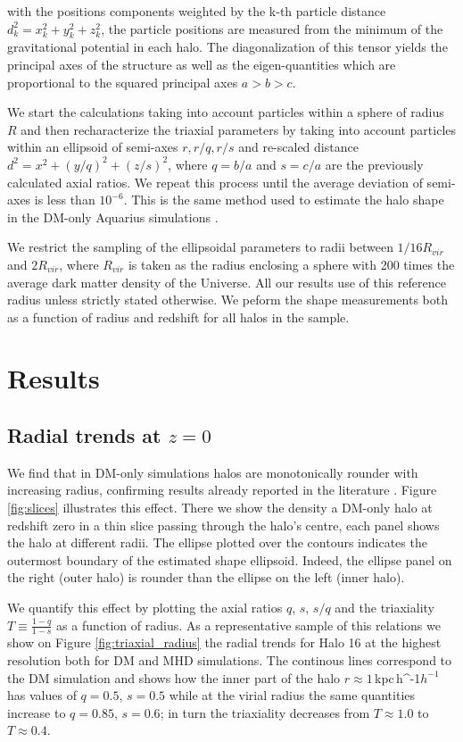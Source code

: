 \documentclass[a4paper,fleqn,usenatbib]{mnras}
\newcommand{\kpch}{\,{\rm kpc}\,\ifmmode h^{-1}\else $h^{-1}$\fi}
\begin{document}
with the positions components weighted by the k-th particle distance
$d_k^2=x_k^2+y_k^2+z_k^2$, the particle positions are measured from
the minimum of the gravitational potential in each halo.
The diagonalization of this tensor yields the principal axes of the
structure as well as the eigen-quantities which are proportional to
the squared principal axes $a>b>c$. 

We start the calculations taking into account particles within a
sphere of radius $R$ and then  recharacterize the triaxial parameters
by taking into account particles within an ellipsoid of semi-axes
$r,r/q,r/s$ and re-scaled distance $d^2=x^2+(y/q)^2+(z/s)^2$, where $q
= b/a$ and $s=c/a$ are the previously calculated axial ratios. 
We repeat this process until the average deviation of semi-axes is
less than $10^{-6}$.  
This is the same method used to estimate the halo shape in the DM-only
Aquarius simulations \citep{Vera-Ciro_et_al._2011}. 

We restrict the sampling of the ellipsoidal parameters to radii
between $1/16 R_{vir}$ and $2R_{vir}$, where  $R_{vir}$ is taken as the
radius enclosing a sphere with 200 times the average dark matter
density of the Universe. 
All our results use of this reference radius
unless strictly stated otherwise. 
We peform the shape measurements both as a function of radius and
redshift for all halos in the sample.


\section{Results}

\subsection{Radial trends at $z=0$}


We find that in DM-only simulations halos are monotonically rounder
with increasing radius, confirming results already reported in the
literature \citep{Vera-Ciro_et_al._2011}. 
Figure \ref{fig:slices} illustrates this effect.
There we show the density a DM-only halo at redshift zero in a thin
slice passing through the halo's centre, each panel shows the halo at
different radii.
The ellipse plotted over the contours indicates the outermost
boundary of the estimated shape ellipsoid. 
Indeed, the ellipse panel on the right (outer halo) is rounder than
the ellipse on the left (inner halo). 



We quantify this effect by plotting the axial ratios $q$, $s$,
$s/q$ and the triaxiality $T\equiv \frac{1-q}{1-s}$ as a
function of radius. 
As a representative sample of this relations we show on Figure
\ref{fig:triaxial_radius} the radial trends for Halo 16 at
the highest resolution both for DM and MHD simulations.
The continous lines correspond to the DM simulation and shows how
the inner part of the halo $r\approx 1$\kpch has values of 
$q=0.5$, $s=0.5$ while at the virial radius the same
quantities increase to $q=0.85$, $s=0.6$; in turn the triaxiality
decreases from $T\approx 1.0$ to $T\approx0.4$. 
\end{document}
